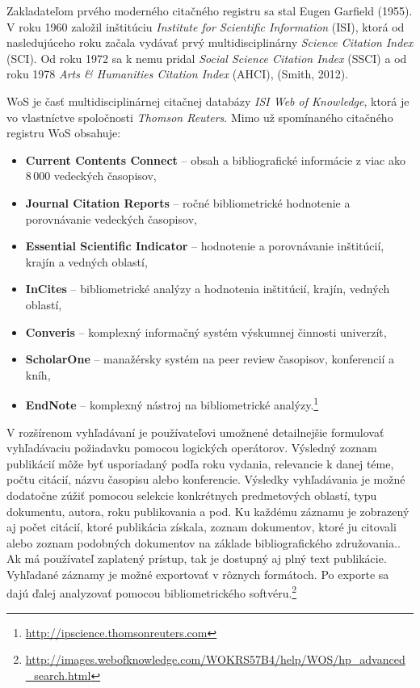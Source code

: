 Zakladateľom prvého moderného citačného registru sa stal Eugen Garfield (1955).
V roku 1960 založil inštitúciu \emph{Institute for Scientific Information}
(ISI), ktorá od nasledujúceho roku začala vydávať prvý multidisciplinárny
 \emph{Science Citation Index} (SCI).  Od
roku 1972 sa k nemu pridal  \emph{Social
  Science Citation Index} (SSCI) a od roku 1978  \emph{Arts \& Humanities Citation Index} (AHCI), (Smith,
2012).

WoS je časť multidisciplinárnej citačnej databázy \emph{ISI Web of Knowledge},
ktorá je vo vlastníctve spoločnosti \emph{Thomson Reuters}.  Mimo už spomínaného
citačného registru WoS obsahuje:

\begin{itemize}

\item \textbf{Current Contents Connect} -- obsah a bibliografické informácie z
  viac ako 8\,000 vedeckých časopisov,

\item \textbf{Journal Citation Reports} -- ročné bibliometrické hodnotenie a
  porovnávanie vedeckých časopisov,

\item \textbf{Essential Scientific Indicator} -- hodnotenie a porovnávanie
  inštitúcií, krajín a vedných oblastí,

\item \textbf{InCites} -- bibliometrické analýzy a hodnotenia inštitúcií,
  krajín, vedných oblastí,

\item \textbf{Converis} -- komplexný informačný systém výskumnej činnosti
  univerzít,

\item \textbf{ScholarOne} -- manažérsky systém na peer review časopisov,
  konferencií a kníh,

\item \textbf{EndNote} -- komplexný nástroj na bibliometrické
  analýzy.\footnote{\url{http://ipscience.thomsonreuters.com}}

\end{itemize}

V rozšírenom vyhľadávaní je používateľovi umožnené detailnejšie formulovať
vyhľadávaciu požiadavku pomocou logických operátorov.  Výsledný zoznam
publikácií môže byť usporiadaný podľa roku vydania, relevancie k danej téme,
počtu citácií, názvu časopisu alebo konferencie.  Výsledky vyhľadávania je možné
dodatočne zúžiť pomocou selekcie konkrétnych predmetových oblastí, typu
dokumentu, autora, roku publikovania a pod.  Ku každému záznamu je zobrazený aj
počet citácií, ktoré publikácia získala, zoznam dokumentov, ktoré ju citovali
alebo zoznam podobných dokumentov na základe bibliografického združovania..  Ak
má používateľ zaplatený prístup, tak je dostupný aj plný text publikácie.
Vyhľadané záznamy je možné exportovať v rôznych formátoch.  Po exporte sa dajú
ďalej analyzovať pomocou bibliometrického
softvéru.\footnote{\url{http://images.webofknowledge.com/WOKRS57B4/help/WOS/hp_advanced_search.html}}

